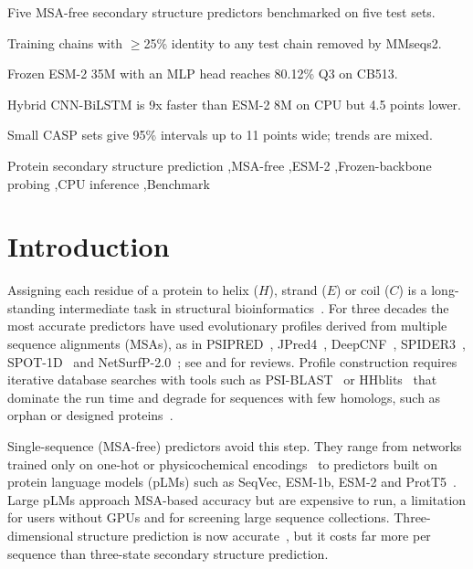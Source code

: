 \documentclass[preprint,12pt,authoryear]{elsarticle}
\begin{document}
\begin{frontmatter}
\begin{highlights}
\item Five MSA-free secondary structure predictors benchmarked on five test sets.
\item Training chains with $\geq$25\% identity to any test chain removed by MMseqs2.
\item Frozen ESM-2 35M with an MLP head reaches 80.12\% Q3 on CB513.
\item Hybrid CNN-BiLSTM is 9x faster than ESM-2 8M on CPU but 4.5 points lower.
\item Small CASP sets give 95\% intervals up to 11 points wide; trends are mixed.
\end{highlights}

\begin{keyword}
Protein secondary structure prediction \sep MSA-free \sep ESM-2 \sep Frozen-backbone probing \sep CPU inference \sep Benchmark
\end{keyword}

\end{frontmatter}

\section{Introduction}
\label{sec:intro}
Assigning each residue of a protein to helix ($H$), strand ($E$) or coil ($C$) is a long-standing intermediate task in structural bioinformatics~\citep{rost1993prediction,kabsch1983dictionary}. For three decades the most accurate predictors have used evolutionary profiles derived from multiple sequence alignments (MSAs), as in PSIPRED~\citep{jones1999protein,buchan2019psipred}, JPred4~\citep{drozdetskiy2015jpred4}, DeepCNF~\citep{wang2016protein}, SPIDER3~\citep{heffernan2017capturing}, SPOT-1D~\citep{hanson2019improving} and NetSurfP-2.0~\citep{klausen2019netsurfp}; see \citet{rost2001review} and \citet{yang2018sixty} for reviews. Profile construction requires iterative database searches with tools such as PSI-BLAST~\citep{altschul1997gapped} or HHblits~\citep{remmert2012hhblits} that dominate the run time and degrade for sequences with few homologs, such as orphan or designed proteins~\citep{singh2021spot1d,elnaggar2022prottrans}.

Single-sequence (MSA-free) predictors avoid this step. They range from networks trained only on one-hot or physicochemical encodings~\citep{singh2021spot1d} to predictors built on protein language models (pLMs) such as SeqVec, ESM-1b, ESM-2 and ProtT5~\citep{heinzinger2019modeling,rives2021biological,lin2023evolutionary,elnaggar2022prottrans,hoie2022netsurfp3}. Large pLMs approach MSA-based accuracy but are expensive to run, a limitation for users without GPUs and for screening large sequence collections. Three-dimensional structure prediction is now accurate~\citep{jumper2021highly,lin2023evolutionary}, but it costs far more per sequence than three-state secondary structure prediction.
\end{document}
